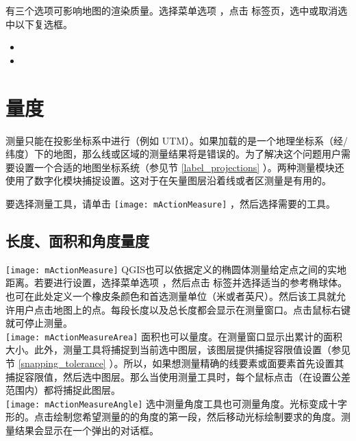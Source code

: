 \label{label_renderquality}

有三个选项可影响地图的渲染质量。选择菜单选项  \arrow {}，点击  标签页，选中或取消选中以下复选框。

\begin{itemize}
\item {}
\item {}
\end{itemize}

\section{量度}\label{sec:measure}

测量只能在投影坐标系中进行（例如 UTM）。如果加载的是一个地理坐标系（经/纬度）下的地图，那么线或区域的测量结果将是错误的。为了解决这个问题用户需要设置一个合适的地图坐标系统（参见节 \ref{label_projections} ）。两种测量模块还使用了数字化模块捕捉设置。这对于在矢量图层沿着线或者区测量是有用的。

要选择测量工具，请单击 \texttt{[image: mActionMeasure]} ，然后选择需要的工具。

\subsection{长度、面积和角度量度}

\texttt{[image: mActionMeasure]}
QGIS也可以依据定义的椭圆体测量给定点之间的实地距离。若要进行设置，选择菜单选项  \arrow {}，然后点击  标签并选择适当的参考椭球体。也可在此处定义一个橡皮条颜色和首选测量单位（米或者英尺）。然后该工具就允许用户点击地图上的点。每段长度以及总长度都会显示在测量窗口。点击鼠标右键就可停止测量。 \\

\texttt{[image: mActionMeasureArea]} 面积也可以量度。在测量窗口显示出累计的面积大小。此外，测量工具将捕捉到当前选中图层，该图层提供捕捉容限值设置（参见节 \ref{snapping_tolerance} ）。所以，如果想测量精确的线要素或面要素首先设置其捕捉容限值，然后选中图层。那么当使用测量工具时，每个鼠标点击（在设置公差范围内）都将捕捉此图层。 \\

\texttt{[image: mActionMeasureAngle]}
选中测量角度工具也可测量角度。光标变成十字形的。点击绘制您希望测量的的角度的第一段，然后移动光标绘制要求的角度。测量结果会显示在一个弹出的对话框。

